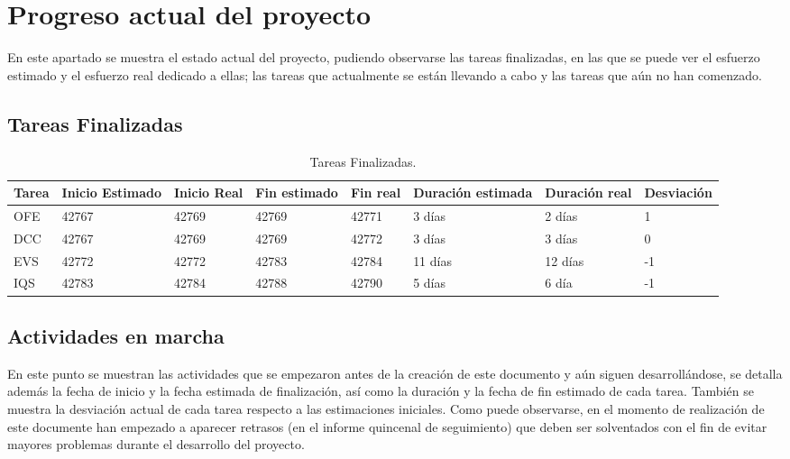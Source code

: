 \section{Progreso actual del proyecto}

\par En este apartado se muestra el estado actual del proyecto, pudiendo observarse las tareas finalizadas, en las que se puede ver el esfuerzo estimado y el esfuerzo real dedicado a ellas; las tareas que actualmente se están llevando a cabo y las tareas que aún no han comenzado.

\subsection{Tareas Finalizadas}
\begin{table}[h]
\begin{center}
\begin{tabular}{ l l l l l l l l }

	Tarea & Inicio Estimado & Inicio Real & Fin estimado & Fin real & Duración estimada & Duración real & Desviación \\ \hline \hline
	OFE & 42767 & 42769 & 42769 & 42771 & 3 días & 2 días & 1 \\ \hline
	DCC & 42767 & 42769 & 42769 & 42772 & 3 días & 3 días  & 0 \\ \hline
	EVS & 42772 & 42772 & 42783 & 42784 & 11 días & 12 días & -1 \\ \hline
	IQS & 42783 & 42784 & 42788 & 42790 & 5 días & 6 día & -1 \\ \hline
\end{tabular}
\caption{Tareas Finalizadas.}
\label{tab:Tareas Finalizadas}
\end{center}
\end{table}

\subsection{Actividades en marcha}
\par En este punto se muestran las actividades que se empezaron antes de la creación de este documento y aún siguen desarrollándose, se detalla además la fecha de inicio y la fecha estimada de finalización, así como la duración y la fecha de fin estimado de cada tarea. También se muestra la desviación actual de cada tarea respecto a las estimaciones iniciales. Como puede observarse, en el momento de realización de este documente han empezado a aparecer retrasos (en el informe quincenal de seguimiento) que deben ser solventados con el fin de evitar mayores problemas durante el desarrollo del proyecto.


